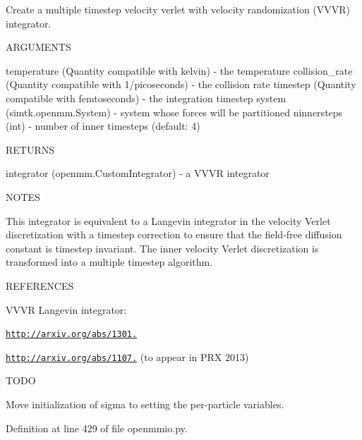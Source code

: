 Create a multiple timestep velocity verlet with velocity randomization (V\+V\+VR) integrator. 

A\+R\+G\+U\+M\+E\+N\+TS

temperature (Quantity compatible with kelvin) -\/ the temperature collision\+\_\+rate (Quantity compatible with 1/picoseconds) -\/ the collision rate timestep (Quantity compatible with femtoseconds) -\/ the integration timestep system (simtk.\+openmm.\+System) -\/ system whose forces will be partitioned ninnersteps (int) -\/ number of inner timesteps (default\+: 4)

R\+E\+T\+U\+R\+NS

integrator (openmm.\+Custom\+Integrator) -\/ a V\+V\+VR integrator

N\+O\+T\+ES

This integrator is equivalent to a Langevin integrator in the velocity Verlet discretization with a timestep correction to ensure that the field-\/free diffusion constant is timestep invariant. The inner velocity Verlet discretization is transformed into a multiple timestep algorithm.

R\+E\+F\+E\+R\+E\+N\+C\+ES

V\+V\+VR Langevin integrator\+:
\begin{DoxyItemize}
\item \href{http://arxiv.org/abs/1301.3800}{\tt http\+://arxiv.\+org/abs/1301.}
\item \href{http://arxiv.org/abs/1107.2967}{\tt http\+://arxiv.\+org/abs/1107.} (to appear in P\+RX 2013)
\end{DoxyItemize}

T\+O\+DO

Move initialization of \textquotesingle{}sigma\textquotesingle{} to setting the per-\/particle variables. 

Definition at line 429 of file openmmio.\+py.

